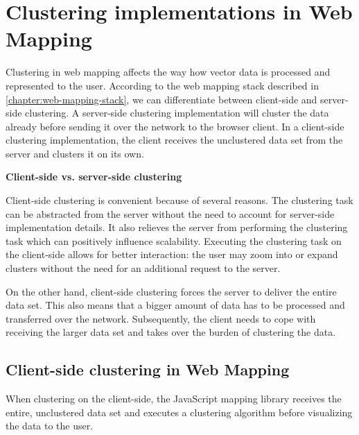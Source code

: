 
%
%

\section{Clustering implementations in Web Mapping}

Clustering in web mapping affects the way how vector data is processed and represented to the user.  According to the web mapping stack described in \ref{chapter:web-mapping-stack}, we can differentiate between client-side and server-side clustering. A server-side clustering implementation will cluster the data already before sending it over the network to the browser client. In a client-side clustering implementation, the client receives the unclustered data set from the server and clusters it on its own.

\textbf{Client-side vs. server-side clustering}

Client-side clustering is convenient because of several reasons. The clustering task can be abstracted from the server without the need to account for server-side implementation details. It also relieves the server from performing the clustering task which can positively influence scalability. Executing the clustering task on the client-side allows for better interaction: the user may zoom into or expand clusters without the need for an additional request to the server. 

On the other hand, client-side clustering forces the server to deliver the entire data set. This also means that a bigger amount of data has to be processed and transferred over the network. Subsequently, the client needs to cope with receiving the larger data set and takes over the burden of clustering the data.

\subsection{Client-side clustering in Web Mapping}

When clustering on the client-side, the JavaScript mapping library receives the entire, unclustered data set and executes a clustering algorithm before visualizing the data to the user.

